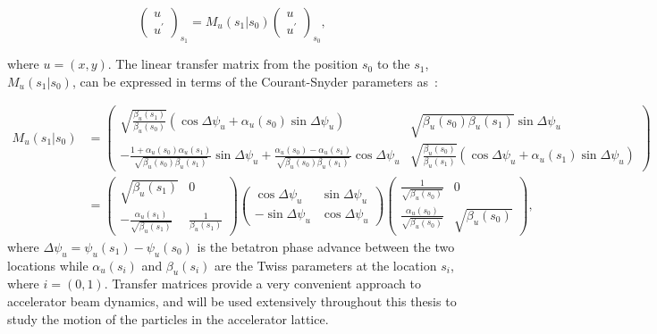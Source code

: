 \begin{equation}\label{eq:matrix_formalism_intro}
   \begin{pmatrix}
    u\\ 
    u^\prime
    \end{pmatrix}_{s_1} = M_u (s_1 |  s_0) \begin{pmatrix}
    u\\ 
    u^\prime
    \end{pmatrix}_{s_0},
\end{equation}

where $u=(x,y)$. The linear transfer matrix from the position $s_0$ to the $s_1$, $M_u (s_1 | s_0)$, can be expressed in terms of the Courant-Snyder parameters as~\cite{Lee:1425444}: %

\begin{equation}\label{eq:linear_transfer_matrix}
    \begin{split}
    M_u (s_1 |  s_0) &= \begin{pmatrix}
        \sqrt{\frac{\beta_u(s_1)}{\beta_u(s_0)}} (\cos{\Delta \psi_u}+\alpha_u (s_0) \sin{\Delta \psi_u}) & \sqrt{\beta_u(s_0)\beta_u(s_1)}\sin{\Delta \psi_u} \\ 
         - \frac{1+\alpha_u(s_0) \alpha_u(s_1)}{\sqrt{\beta_u(s_0) \beta_u(s_1)}} \sin{\Delta \psi_u}+ \frac{\alpha_u(s_0) - \alpha_u(s_1)}{\sqrt{\beta_u(s_0) \beta_u(s_1)}} \cos{\Delta \psi_u} & \sqrt{\frac{\beta_u(s_0)}{\beta_u(s_1)}} (\cos{\Delta \psi_u}+\alpha_u(s_1) \sin{\Delta \psi_u})
        \end{pmatrix} \\ 
        &=\begin{pmatrix}
            \sqrt{\beta_u(s_1)} & 0 \\
            -\frac{\alpha_u(s_1)}{\sqrt{\beta_u(s_1)}}& \frac{1}{\beta_u(s_1)}
            \end{pmatrix} \begin{pmatrix}
            \cos{\Delta \psi_u} & \sin{\Delta \psi_u} \\
            -\sin{\Delta \psi_u}& \cos{\Delta \psi_u}
            \end{pmatrix} \begin{pmatrix}
            \frac{1}{\sqrt{\beta_u(s_0)}} & 0 \\
            \frac{\alpha_u(s_0)}{\sqrt{\beta_u(s_0)}} & \sqrt{\beta_u(s_0)}
            \end{pmatrix},
    \end{split}
\end{equation}
where $\Delta \psi_u = \psi_u(s_1)-\psi_u(s_0)$ is the betatron phase advance between the two locations while $\alpha_u(s_i)$ and $\beta_u(s_i)$ are the Twiss parameters at the location $s_i$, where $i=(0,1)$. Transfer matrices provide a very convenient approach to accelerator beam dynamics, and will be used extensively throughout this thesis to study the motion of the particles in the accelerator lattice.

